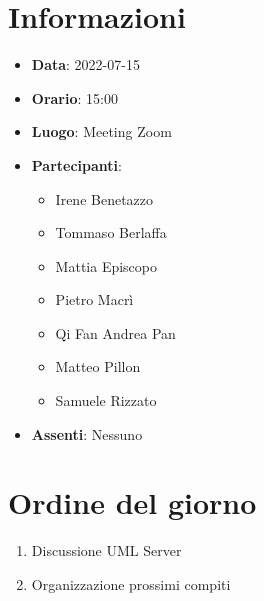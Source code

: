\section{Informazioni}
	\begin{itemize}
		\item \textbf{Data}: 2022-07-15
		\item \textbf{Orario}: 15:00
		\item \textbf{Luogo}: Meeting Zoom
		\item \textbf{Partecipanti}:
		\begin{itemize}
			\item Irene Benetazzo
			\item Tommaso Berlaffa
			\item Mattia Episcopo
			\item Pietro Macrì
			\item Qi Fan Andrea Pan
			\item Matteo Pillon
			\item Samuele Rizzato
		\end{itemize}
        \item \textbf{Assenti}: Nessuno
	\end{itemize}
    
	\section{Ordine del giorno}
	\begin{enumerate}
		\item Discussione UML Server
		\item Organizzazione prossimi compiti
	\end{enumerate}
	\newpage